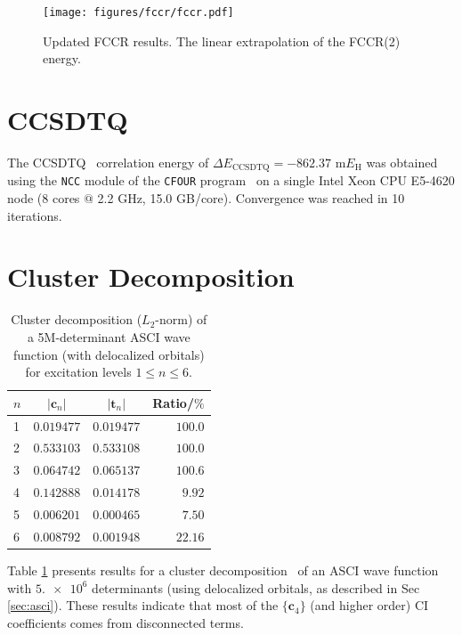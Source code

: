 \documentclass[journal=jcp,manuscript=suppinfo]{achemso}
\begin{document}
%
\begin{figure}[ht!]
\begin{center}
\texttt{[image: figures/fccr/fccr.pdf]}
\caption{Updated FCCR results. The linear extrapolation of the FCCR(2) energy.}
\label{fccr_updated_SI_fig}
\end{center}
\vspace{-0.6cm}
\end{figure}
%

\section{CCSDTQ}

The CCSDTQ~\cite{ccsdtq_paper_1_jcp_1991,ccsdtq_paper_2_jcp_1992} correlation energy of $\Delta E_{\text{CCSDTQ}} = -862.37$ m$E_{\text{H}}$ was obtained using the {\texttt{NCC}} module of the {\texttt{CFOUR}} program~\cite{matthews_stanton_ccsdtq_jcp_2015,ncc,cfour_paper,cfour} on a single Intel Xeon CPU E5-4620 node (8 cores $@$ 2.2 GHz, 15.0 GB/core). Convergence was reached in 10 iterations.

\section{Cluster Decomposition}

%
\begin{table}[ht!]
\begin{center}
\caption{Cluster decomposition ($L_2$-norm) of a 5M-determinant ASCI wave function (with delocalized orbitals) for excitation levels $1 \leq n \leq 6$.}
\label{cluster_decomp_SI_table}
\begin{tabular}{l|r|r|r}
\toprule
\multicolumn{1}{c|}{$n$} & \multicolumn{1}{c|}{$|\bm{c}_n|$} & \multicolumn{1}{c|}{$|\bm{t}_n|$} & \multicolumn{1}{c}{Ratio/$\%$} \\
\midrule\midrule
1 & $0.019477$ & $0.019477$ & $100.0$ \\
2 & $0.533103$ & $0.533108$ & $100.0$ \\
3 & $0.064742$ & $0.065137$ & $100.6$ \\
4 & $0.142888$ & $0.014178$ & $9.92$ \\
5 & $0.006201$ & $0.000465$ & $7.50$ \\
6 & $0.008792$ & $0.001948$ & $22.16$ \\
\midrule
\end{tabular}
\vspace{-0.6cm}
\end{center}
\end{table}
%
Table \ref{cluster_decomp_SI_table} presents results for a cluster decomposition~\cite{lehtola_head_gordon_fci_decomp_jcp_2017} of an ASCI wave function with $\num{5.e6}$ determinants (using delocalized orbitals, as described in Sec \ref{sec:asci}). These results indicate that most of the $\{\bm{c}_4\}$ (and higher order) CI coefficients comes from disconnected terms.\\
\end{document}
